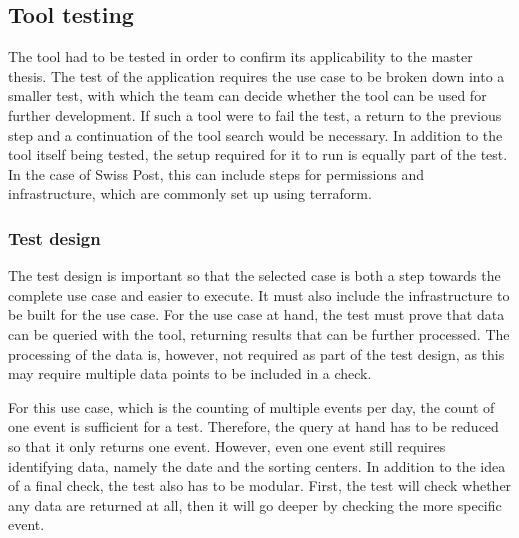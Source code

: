 \subsection*{Tool testing}

The tool had to be tested in order to confirm its applicability to the master thesis. The test of the application requires the use case to be broken down into a smaller test, with which the team can decide whether the tool can be used for further development. If such a tool were to fail the test, a return to the previous step and a continuation of the tool search would be necessary. In addition to the tool itself being tested, the setup required for it to run is equally part of the test. In the case of Swiss Post, this can include steps for permissions and infrastructure, which are commonly set up using \gls{terraform}.



\subsubsection*{Test design}

The test design is important so that the selected case is both a step towards the complete use case and easier to execute. It must also include the infrastructure to be built for the use case. For the use case at hand, the test must prove that data can be queried with the tool, returning results that can be further processed. The processing of the data is, however, not required as part of the test design, as this may require multiple data points to be included in a check.

For this use case, which is the counting of multiple events per day, the count of one event is sufficient for a test. Therefore, the query at hand has to be reduced so that it only returns one event. However, even one event still requires identifying data, namely the date and the sorting centers. In addition to the idea of a final check, the test also has to be modular. First, the test will check whether any data are returned at all, then it will go deeper by checking the more specific event.
